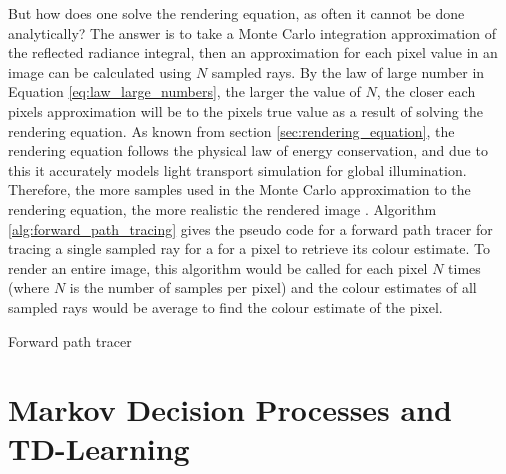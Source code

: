 \documentclass[ %
                    author={Callum Pearce},
                supervisor={Dr. Neill Campbell},
                    degree={MEng},
                     title={How effective are Temporal difference learning methods for reducing the number of zero contribution light paths while still accurately approximating Global Illumination in Path tracing?},
                  subtitle={},
                      type={research},
                      year={2019} ]{dissertation}
\begin{document}
But how does one solve the rendering equation, as often it cannot be done analytically? The answer is to take a Monte Carlo integration approximation of the reflected radiance integral, then an approximation for each pixel value in an image can be calculated using $N$ sampled rays. By the law of large number in Equation \ref{eq:law_large_numbers}, the larger the value of $N$, the closer each pixels approximation will be to the pixels true value as a result of solving the rendering equation. As known from section \ref{sec:rendering_equation}, the rendering equation follows the physical law of energy conservation, and due to this it accurately models light transport simulation for global illumination. Therefore, the more samples used in the Monte Carlo approximation to the rendering equation, the more realistic the rendered image \cite{christensen2016path}. Algorithm \ref{alg:forward_path_tracing} gives the pseudo code for a forward path tracer for tracing a single sampled ray for a for a pixel to retrieve its colour estimate. To render an entire image, this algorithm would be called for each pixel $N$ times (where $N$ is the number of samples per pixel) and the colour estimates of all sampled rays would be average to find the colour estimate of the pixel.

\begin{algorithm}[H]
\label{alg:forward_path_tracing}
\SetAlgoLined
 
 \caption{Forward path tracer}
\end{algorithm}
\section{Markov Decision Processes and TD-Learning}
\end{document}
